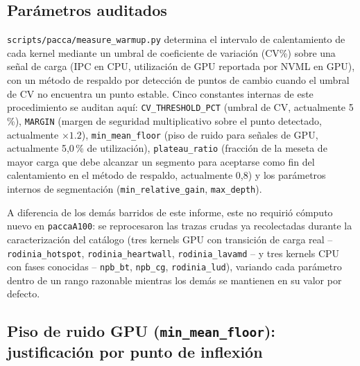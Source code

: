 \subsection{Parámetros auditados}

\texttt{scripts/pacca/measure\_warmup.py} determina el intervalo de
calentamiento de cada kernel mediante un umbral de coeficiente de variación
(CV\%) sobre una señal de carga (IPC en CPU, utilización de GPU reportada
por NVML en GPU), con un método de respaldo por detección de puntos de
cambio cuando el umbral de CV no encuentra un punto estable. Cinco
constantes internas de este procedimiento se auditan aquí:
\texttt{CV\_THRESHOLD\_PCT} (umbral de CV, actualmente 5\,\%),
\texttt{MARGIN} (margen de seguridad multiplicativo sobre el punto
detectado, actualmente $\times 1.2$), \texttt{min\_mean\_floor} (piso de
ruido para señales de GPU, actualmente 5{,}0\,\% de utilización),
\texttt{plateau\_ratio} (fracción de la meseta de mayor carga que debe
alcanzar un segmento para aceptarse como fin del calentamiento en el
método de respaldo, actualmente 0{,}8) y los parámetros internos de
segmentación (\texttt{min\_relative\_gain}, \texttt{max\_depth}).

A diferencia de los demás barridos de este informe, este no requirió
cómputo nuevo en \texttt{paccaA100}: se reprocesaron las trazas crudas ya
recolectadas durante la caracterización del catálogo (tres kernels GPU con
transición de carga real -- \texttt{rodinia\_hotspot}, \texttt{rodinia\_heartwall},
\texttt{rodinia\_lavamd} -- y tres kernels CPU con fases conocidas --
\texttt{npb\_bt}, \texttt{npb\_cg}, \texttt{rodinia\_lud}), variando cada
parámetro dentro de un rango razonable mientras los demás se mantienen en
su valor por defecto.

\subsection{Piso de ruido GPU (\texttt{min\_mean\_floor}): justificación por punto de inflexión}

